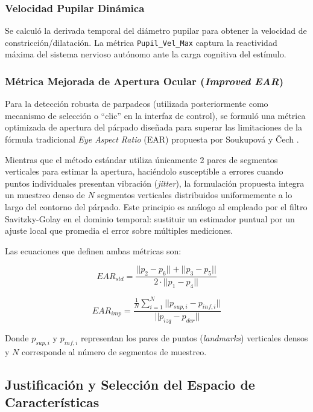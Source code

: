 \subsubsection{Velocidad Pupilar Dinámica}
Se calculó la derivada temporal del diámetro pupilar para obtener la velocidad de constricción/dilatación.
La métrica \texttt{Pupil\_Vel\_Max} captura la reactividad máxima del sistema nervioso autónomo ante la carga cognitiva del estímulo.


\subsubsection{Métrica Mejorada de Apertura Ocular (\textit{Improved EAR})}

Para la detección robusta de parpadeos (utilizada posteriormente como mecanismo de selección o ``clic'' en la interfaz de control), se formuló una métrica optimizada de apertura del párpado diseñada para superar las limitaciones de la fórmula tradicional \textit{Eye Aspect Ratio} (EAR) propuesta por Soukupová y Čech \cite{soukupova2016real}. 

Mientras que el método estándar utiliza únicamente 2 pares de segmentos verticales para estimar la apertura, haciéndolo susceptible a errores cuando puntos individuales presentan vibración (\textit{jitter}), la formulación propuesta integra un muestreo denso de $N$ segmentos verticales distribuidos uniformemente a lo largo del contorno del párpado. Este principio es análogo al empleado por el filtro Savitzky-Golay \cite{savitzky1964smoothing} en el dominio temporal: sustituir un estimador puntual por un ajuste local que promedia el error sobre múltiples mediciones.

Las ecuaciones que definen ambas métricas son:

\begin{equation}
	EAR_{std} = \frac{||p_2 - p_6|| + ||p_3 - p_5||}{2 \cdot ||p_1 - p_4||}
\end{equation}

\begin{equation}
	EAR_{imp} = \frac{\frac{1}{N} \sum_{i=1}^{N} ||p_{sup,i} - p_{inf,i}||}{||p_{izq} - p_{der}||}
	\label{eq:ear_improved_def}
\end{equation}

Donde $p_{sup,i}$ y $p_{inf,i}$ representan los pares de puntos (\textit{landmarks}) verticales densos y $N$ corresponde al número de segmentos de muestreo.

\subsection{Justificación y Selección del Espacio de Características}
\label{subsec:justificacion_metricas}

